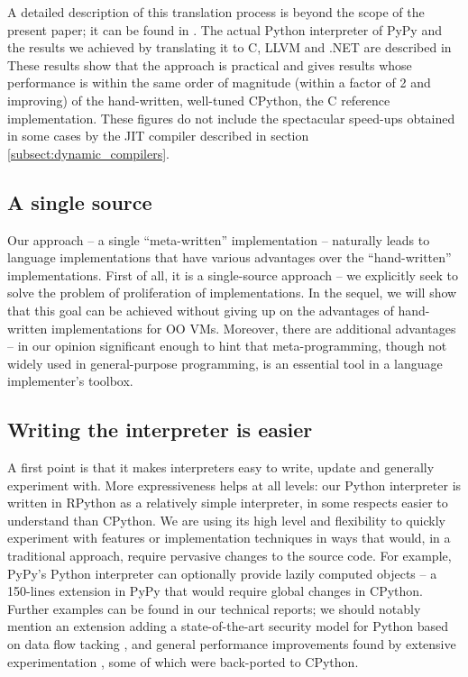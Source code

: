 \documentclass{llncs}
\begin{document}
A detailed description of this translation process is beyond the scope of the
present paper; it can be found in \cite{pypyvmconstruction}.  The actual Python
interpreter of PyPy and the results we achieved by translating it to C, LLVM
\cite{LLVM} and .NET are described in \cite{architecture} \cite{translationdoc}
These results show that the
approach is practical and gives results whose performance is within the same
order of magnitude (within a factor of 2 and improving) of the hand-written,
well-tuned CPython, the C reference implementation.  These figures do not
include the spectacular speed-ups obtained in some cases by the JIT compiler
described in section \ref{subsect:dynamic_compilers}.

\subsection{A single source}

Our approach -- a single ``meta-written'' implementation -- naturally
leads to language implementations that have various advantages over the
``hand-written'' implementations.  First of all, it is a single-source
approach -- we explicitly seek to solve the problem of proliferation of
implementations.  In the sequel, we will show that this goal can be
achieved without giving up on the advantages of hand-written
implementations for OO VMs.  Moreover, there are additional advantages
-- in our opinion significant enough to hint that meta-programming,
though not widely used in general-purpose programming, is an essential
tool in a language implementer's toolbox.

\subsection{Writing the interpreter is easier}

A first point is that it makes interpreters easy to write, update and
generally experiment with.  More expressiveness helps at all levels: our
Python interpreter is written in RPython as a relatively simple
interpreter, in some respects easier to understand than CPython.  We are
using its high level and flexibility to quickly experiment with features
or implementation techniques in ways that would, in a traditional
approach, require pervasive changes to the source code.  For example,
PyPy's Python interpreter can optionally provide lazily computed objects
-- a 150-lines extension in PyPy that would require global changes in
CPython.  Further examples can be found in our technical reports; we
should notably mention an extension adding a state-of-the-art security
model for Python based on data flow tacking \cite{D12.1}, and general
performance improvements found by extensive experimentation \cite{D06.1}, some
of which were back-ported to CPython.
\end{document}
